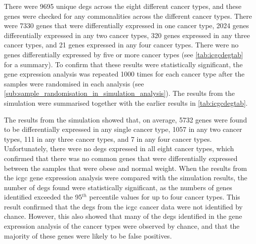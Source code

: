 There were 9695 unique \glspl{deg} across the eight different cancer types, and these genes were checked for any commonalities across the different cancer types.
There were 7330 genes that were differentially expressed in one cancer type, 2024 genes differentially expressed in any two cancer types, 320 genes expressed in any three cancer types, and 21 genes expressed in any four cancer types.
There were no genes differentially expressed by five or more cancer types (see \cref{tab:icgcdegtab} for a summary).
To confirm that these results were statistically significant, the gene expression analysis was repeated 1000 times for each cancer type after the samples were randomised in each analysis (see \cref{sub:sample_randomisation_in_simulation_analysis}).
The results from the simulation were summarised together with the earlier results in \cref{tab:icgcdegtab}.

The results from the simulation showed that, on average, 5732 genes were found to be differentially expressed in any single cancer type, 1057 in any two cancer types, 111 in any three cancer types, and 7 in any four cancer types.
Unfortunately, there were no \glspl{deg} expressed in all eight cancer types, which confirmed that there was no common genes that were differentially expressed between the samples that were obese and normal weight.
When the results from the \gls{icgc} gene expression analysis were compared with the simulation results, the number of \glspl{deg} found were statistically significant, as the numbers of genes identified exceeded the 95$^{th}$ percentile values for up to four cancer types.
This result confirmed that the \glspl{deg} from the \gls{icgc} cancer data were not identified by chance.
However, this also showed that many of the \glspl{deg} identified in the gene expression analysis of the cancer types were observed by chance, and that the majority of these genes were likely to be false positives.

